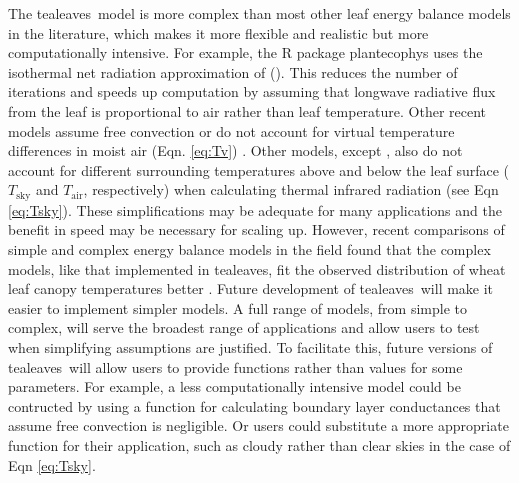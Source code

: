 \documentclass[11pt, oneside]{article}
\newcommand{\pkg}[1]{{\fontseries{b}\selectfont #1}}
\newcommand{\tealeaves}{\pkg{tealeaves}}
\begin{document}
The \tealeaves~model is more complex than most other leaf energy balance models in the literature, which makes it more flexible and realistic but more computationally intensive. For example, the R package \pkg{plantecophys} \citep{Duursma_2015} uses the isothermal net radiation approximation of \citeauthor{Leuning_etal_1995} (\citeyear{Leuning_etal_1995}). This reduces the number of iterations and speeds up computation by assuming that longwave radiative flux from the leaf is proportional to air rather than leaf temperature. Other recent models \citep[e.g.][]{Buckley_etal_2014, Schymanski_Or_2017} assume free convection or do not account for virtual temperature differences in moist air (Eqn. \ref{eq:Tv}) \citep{Okajima_etal_2012, Duursma_2015}. Other models, except \citeauthor{Okajima_etal_2012} \citeyear{Okajima_etal_2012}, also do not account for different surrounding temperatures above and below the leaf surface ($T_\mathrm{sky}$ and $T_\mathrm{air}$, respectively) when calculating thermal infrared radiation (see Eqn \ref{eq:Tsky}). These simplifications may be adequate for many applications and the benefit in speed may be necessary for scaling up. However, recent comparisons of simple and complex energy balance models in the field found that the complex models, like that implemented in \tealeaves, fit the observed distribution of wheat leaf canopy temperatures better \citep{Webber_etal_2017}. Future development of \tealeaves~will make it easier to implement simpler models. A full range of models, from simple to complex, will serve the broadest range of applications and allow users to test when simplifying assumptions are justified. To facilitate this, future versions of \tealeaves~will allow users to provide functions rather than values for some parameters. For example, a less computationally intensive model could be contructed by using a function for calculating boundary layer conductances that assume free convection is negligible. Or users could substitute a more appropriate function for their application, such as cloudy rather than clear skies in the case of Eqn \ref{eq:Tsky}.
\end{document}
